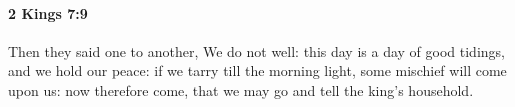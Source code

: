 
		\paragraph{2 Kings 7:9} %
			\label{2KINGS-7-9}

			Then they said one to another, We do not well: this day is a day of good tidings, and we hold our peace: if we tarry till the morning light, some mischief will come upon us: now therefore come, that we may go and tell the king’s household.


